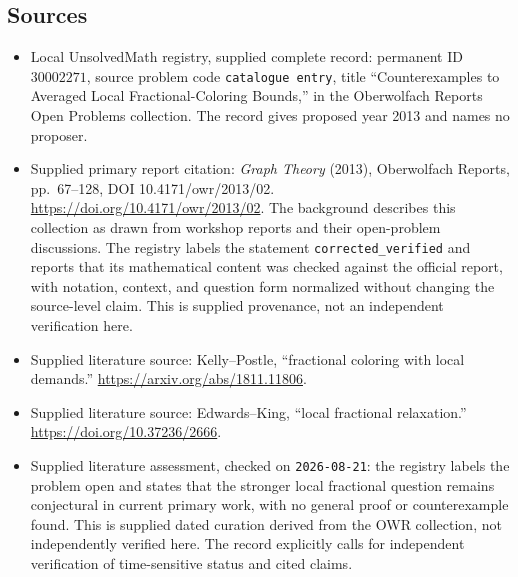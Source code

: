 \documentclass[11pt]{article}
\begin{document}
\subsection{Sources}
\begin{itemize}
\item Local UnsolvedMath registry, supplied complete record: permanent ID \(30002271\), source problem code \texttt{catalogue entry}, title ``Counterexamples to Averaged Local Fractional-Coloring Bounds,'' in the Oberwolfach Reports Open Problems collection. The record gives proposed year 2013 and names no proposer.
\item Supplied primary report citation: \emph{Graph Theory} (2013), Oberwolfach Reports, pp.~67--128, DOI 10.4171/owr/2013/02. \url{https://doi.org/10.4171/owr/2013/02}. The background describes this collection as drawn from workshop reports and their open-problem discussions. The registry labels the statement \texttt{corrected\_verified} and reports that its mathematical content was checked against the official report, with notation, context, and question form normalized without changing the source-level claim. This is supplied provenance, not an independent verification here.
\item Supplied literature source: Kelly--Postle, ``fractional coloring with local demands.'' \url{https://arxiv.org/abs/1811.11806}.
\item Supplied literature source: Edwards--King, ``local fractional relaxation.'' \url{https://doi.org/10.37236/2666}.
\item Supplied literature assessment, checked on \texttt{2026-08-21}: the registry labels the problem open and states that the stronger local fractional question remains conjectural in current primary work, with no general proof or counterexample found. This is supplied dated curation derived from the OWR collection, not independently verified here. The record explicitly calls for independent verification of time-sensitive status and cited claims.
\end{itemize}
\end{document}

